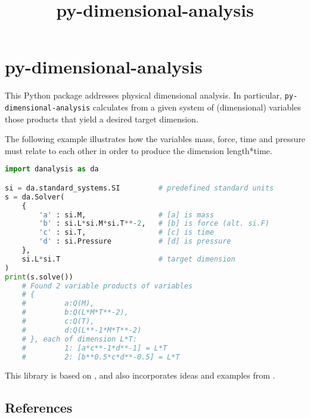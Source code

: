 \documentclass[11pt]{article}
\title{py-dimensional-analysis}
\date{}
\begin{document}
\maketitle

\section{py-dimensional-analysis}
This Python package addresses physical dimensional analysis. In particular, \texttt{py-dimensional-analysis} calculates from a given system of (dimensional) variables those products that yield a desired target dimension.


The following example illustrates how the variables mass, force, time and pressure must relate to each other in order to produce the dimension length*time.

\begin{lstlisting}[language=Python]
import danalysis as da

si = da.standard_systems.SI         # predefined standard units
s = da.Solver(
    {
        'a' : si.M,                 # [a] is mass
        'b' : si.L*si.M*si.T**-2,   # [b] is force (alt. si.F)
        'c' : si.T,                 # [c] is time
        'd' : si.Pressure           # [d] is pressure
    },
    si.L*si.T                       # target dimension
)
print(s.solve())
    # Found 2 variable products of variables
    # {
    #         a:Q(M),
    #         b:Q(L*M*T**-2),
    #         c:Q(T),
    #         d:Q(L**-1*M*T**-2)
    # }, each of dimension L*T:
    #         1: [a*c**-1*d**-1] = L*T
    #         2: [b**0.5*c*d**-0.5] = L*T
\end{lstlisting}

This library is based on \cite{szirtes2007applied}, and also incorporates ideas and examples from \cite{santiago2019first, sonin2001dimensional}.

\subsection{References}

\begingroup
\renewcommand{\section}[2]{}%

\endgroup
\end{document}
